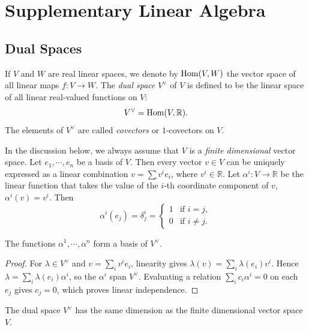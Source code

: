 \section{Supplementary Linear Algebra}

\subsection{Dual Spaces}\label{sec:dualspace}

If $V$ and $W$ are real linear spaces, we denote by $\operatorname{Hom}(V,W)$ the vector
space of all linear maps $f: V\to W$. The \emph{dual space} $V^\vee$ of $V$ is
defined to be the linear space of all linear real-valued functions on $V$:
\begin{displaymath}
	V^\vee = \operatorname{Hom}(V,\mathbb{R}).
\end{displaymath}
The elements of $V^\vee$ are called \emph{covectors} or $1$-covectors on $V$.

In the discussion below, we always assume that $V$ is a \emph{finite
	dimensional} vector space. Let $e_1,\cdots, e_n$ be a basis of $V$. Then
every vector $v\in V$ can be uniquely expressed as a linear combination $v=
	\sum v^i e_i$, where $v^i\in\mathbb{R}$. Let $\alpha^i: V\to \mathbb{R}$
be the linear function that takes the value of the $i$-th coordinate component
of $v$, $\alpha^i(v) = v^i$. Then
\begin{displaymath}
	\alpha^i(e_j) = \delta^i_j =
	\begin{cases}
		1 & \text{if $i=j$},     \\
		0 & \text{if $i\neq j$}.
	\end{cases}
\end{displaymath}

\begin{proposition}
	The functions $\alpha^1,\cdots, \alpha^n$ form a basis of $V^\vee$.
\end{proposition}

\begin{proof}
For $\lambda\in V^\vee$ and $v=\sum_i v^ie_i$, linearity gives
$\lambda(v)=\sum_i\lambda(e_i)v^i$. Hence
$\lambda=\sum_i\lambda(e_i)\alpha^i$, so the $\alpha^i$ span $V^\vee$.
Evaluating a relation $\sum_i c_i\alpha^i=0$ on each $e_j$ gives $c_j=0$,
which proves linear independence.
\end{proof}


\begin{corollary}
	The dual space $V^\vee$ has the same dimension as the finite dimensional
	vector space $V$.
\end{corollary}

